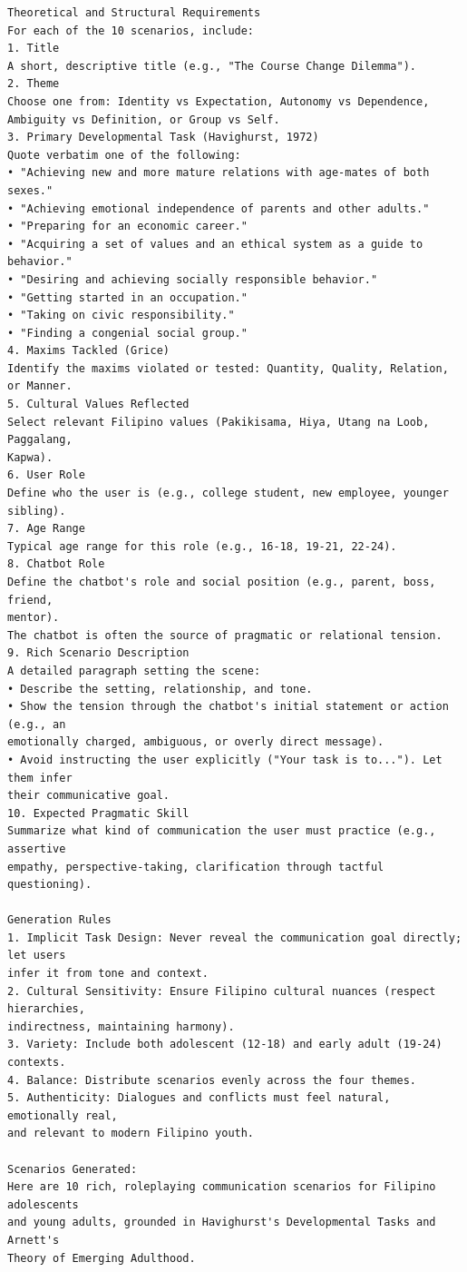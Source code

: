 \begin{verbatim}
Theoretical and Structural Requirements
For each of the 10 scenarios, include:
1. Title
A short, descriptive title (e.g., "The Course Change Dilemma").
2. Theme
Choose one from: Identity vs Expectation, Autonomy vs Dependence, 
Ambiguity vs Definition, or Group vs Self.
3. Primary Developmental Task (Havighurst, 1972)
Quote verbatim one of the following:
• "Achieving new and more mature relations with age-mates of both sexes."
• "Achieving emotional independence of parents and other adults."
• "Preparing for an economic career."
• "Acquiring a set of values and an ethical system as a guide to behavior."
• "Desiring and achieving socially responsible behavior."
• "Getting started in an occupation."
• "Taking on civic responsibility."
• "Finding a congenial social group."
4. Maxims Tackled (Grice)
Identify the maxims violated or tested: Quantity, Quality, Relation, or Manner.
5. Cultural Values Reflected
Select relevant Filipino values (Pakikisama, Hiya, Utang na Loob, Paggalang, 
Kapwa).
6. User Role
Define who the user is (e.g., college student, new employee, younger sibling).
7. Age Range
Typical age range for this role (e.g., 16-18, 19-21, 22-24).
8. Chatbot Role
Define the chatbot's role and social position (e.g., parent, boss, friend, 
mentor).
The chatbot is often the source of pragmatic or relational tension.
9. Rich Scenario Description
A detailed paragraph setting the scene:
• Describe the setting, relationship, and tone.
• Show the tension through the chatbot's initial statement or action (e.g., an 
emotionally charged, ambiguous, or overly direct message).
• Avoid instructing the user explicitly ("Your task is to..."). Let them infer 
their communicative goal.
10. Expected Pragmatic Skill
Summarize what kind of communication the user must practice (e.g., assertive 
empathy, perspective-taking, clarification through tactful questioning).

Generation Rules
1. Implicit Task Design: Never reveal the communication goal directly; let users 
infer it from tone and context.
2. Cultural Sensitivity: Ensure Filipino cultural nuances (respect hierarchies, 
indirectness, maintaining harmony).
3. Variety: Include both adolescent (12-18) and early adult (19-24) contexts.
4. Balance: Distribute scenarios evenly across the four themes.
5. Authenticity: Dialogues and conflicts must feel natural, emotionally real, 
and relevant to modern Filipino youth.

Scenarios Generated:
Here are 10 rich, roleplaying communication scenarios for Filipino adolescents 
and young adults, grounded in Havighurst's Developmental Tasks and Arnett's 
Theory of Emerging Adulthood.


\end{verbatim}
